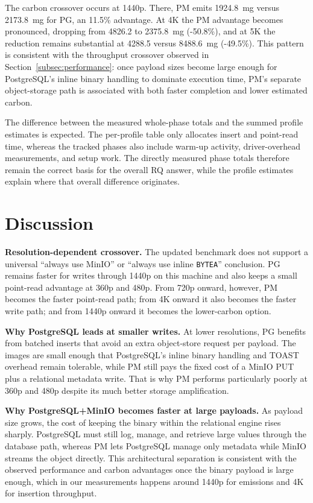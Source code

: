 \documentclass[conference]{IEEEtran}
\begin{document}
The carbon crossover occurs at 1440p. There, PM emits 1924.8~mg versus 2173.8~mg for PG, an 11.5\% advantage. At 4K the PM advantage becomes pronounced, dropping from 4826.2 to 2375.8~mg (-50.8\%), and at 5K the reduction remains substantial at 4288.5 versus 8488.6~mg (-49.5\%). This pattern is consistent with the throughput crossover observed in Section~\ref{subsec:performance}: once payload sizes become large enough for PostgreSQL's inline binary handling to dominate execution time, PM's separate object-storage path is associated with both faster completion and lower estimated carbon.

The difference between the measured whole-phase totals and the summed profile estimates is expected. The per-profile table only allocates insert and point-read time, whereas the tracked phases also include warm-up activity, driver-overhead measurements, and setup work. The directly measured phase totals therefore remain the correct basis for the overall RQ answer, while the profile estimates explain where that overall difference originates.

\section{Discussion}
\label{sec:discussion}

\textbf{Resolution-dependent crossover.} The updated benchmark does not support a universal ``always use MinIO'' or ``always use inline \texttt{BYTEA}'' conclusion. PG remains faster for writes through 1440p on this machine and also keeps a small point-read advantage at 360p and 480p. From 720p onward, however, PM becomes the faster point-read path; from 4K onward it also becomes the faster write path; and from 1440p onward it becomes the lower-carbon option.

\textbf{Why PostgreSQL leads at smaller writes.} At lower resolutions, PG benefits from batched inserts that avoid an extra object-store request per payload. The images are small enough that PostgreSQL's inline binary handling and TOAST overhead remain tolerable, while PM still pays the fixed cost of a MinIO PUT plus a relational metadata write. That is why PM performs particularly poorly at 360p and 480p despite its much better storage amplification.

\textbf{Why PostgreSQL+MinIO becomes faster at large payloads.} As payload size grows, the cost of keeping the binary within the relational engine rises sharply. PostgreSQL must still log, manage, and retrieve large values through the database path, whereas PM lets PostgreSQL manage only metadata while MinIO streams the object directly. This architectural separation is consistent with the observed performance and carbon advantages once the binary payload is large enough, which in our measurements happens around 1440p for emissions and 4K for insertion throughput.
\end{document}
